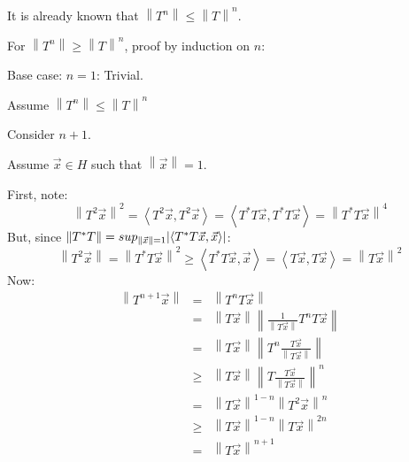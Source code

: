 \documentclass[letterpaper,12pt,fleqn]{article}
\newcommand{\vx}{\vec{x}}
\newcommand{\norm}[1]{\left\|#1\right\|}
\newcommand{\inner}[1]{\left<#1\right>}
\begin{document}
\begin{theproof}
  It is already known that $\norm{T^n}\le\norm{T}^n$.

  For $\norm{T^n}\ge\norm{T}^n$, proof by induction on $n$:
  \begin{description}
  \item Base case: $n=1$: Trivial.

  \item Assume $\norm{T^n}\le\norm{T}^n$

  \item Consider $n+1$.

    Assume $\vx\in H$ such that $\norm{\vx}=1$.
    
    First, note:
    \[\norm{T^2\vx}^2=\inner{T^2\vx,T^2\vx}=\inner{T^*T\vx,T^*T\vx}=
    \norm{T^*T\vx}^4\]
    But, since $\norm{T^*T}=sup_{\norm{\vx}=1}\abs{\inner{T^*T\vx,\vx}}$:
    \[\norm{T^2\vx}=\norm{T^*T\vx}^2\ge\inner{T^*T\vx,\vx}=
    \inner{T\vx,T\vx}=\norm{T\vx}^2\]
    Now:
    \begin{eqnarray*}
      \norm{T^{n+1}\vx} &=& \norm{T^nT\vx} \\
      &=& \norm{T\vx}\norm{\frac{1}{\norm{T\vx}}T^nT\vx} \\
      &=& \norm{T\vx}\norm{T^n\frac{T\vx}{\norm{T\vx}}} \\
      &\ge& \norm{T\vx}\norm{T\frac{T\vx}{\norm{T\vx}}}^n \\
      &=& \norm{T\vx}^{1-n}\norm{T^2\vx}^n \\
      &\ge& \norm{T\vx}^{1-n}\norm{T\vx}^{2n} \\
      &=& \norm{T\vx}^{n+1}
    \end{eqnarray*}
  \end{description}
\end{theproof}
\end{document}
